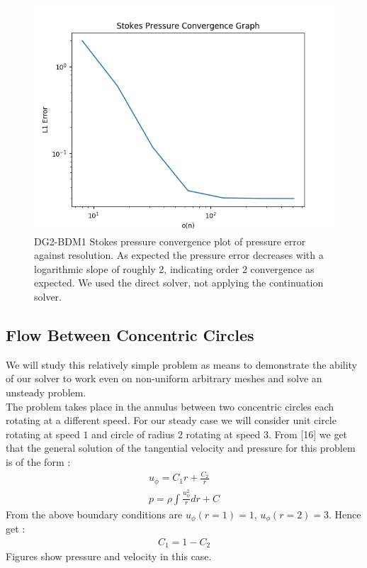 \documentclass[11pt,twoside,a4paper]{article}
\begin{document}
\begin{figure}
\includegraphics[width=\linewidth]{navier_stokes_pressure_convergence_dbc0.png}
  \caption{DG2-BDM1 Stokes pressure convergence plot of pressure error against resolution. As expected the pressure error decreases with a logarithmic slope of roughly 2, indicating order 2 convergence as expected. We used the direct solver, not applying the continuation solver.}
\end{figure}

\subsection{Flow Between Concentric Circles}

We will study this relatively simple problem as means to demonstrate the ability of our solver to work even on non-uniform arbitrary meshes and solve an unsteady problem.\\
The problem takes place in the annulus between two concentric circles each rotating at a different speed. For our steady case we will consider unit circle rotating at speed $1$ and circle of radius $2$ rotating at speed $3$.
From [16] we get that the general solution of the tangential velocity and pressure for this problem is of the form :
\begin{align}
u_{\phi} = C_1 r + \frac{C_2}{r} \\
p = \rho \int \frac{u_{\phi}^2}{r} dr + C
\end{align}
From the above boundary conditions are $u_{\phi}(r=1) = 1$, $u_{\phi}(r=2) = 3$. Hence get :
\begin{align*}
C_1 = 1 - C_2
\end{align*}
Figures show pressure and velocity in this case.\\
\end{document}
